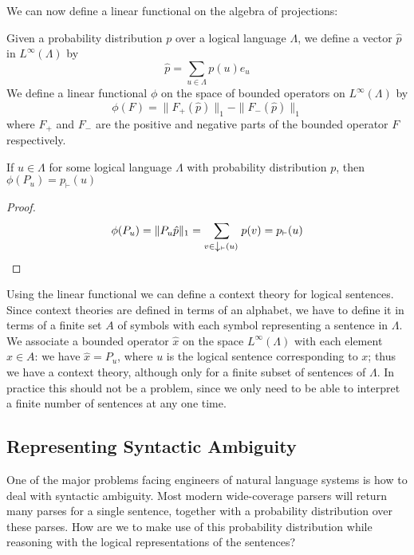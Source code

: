 We can now define a linear functional on the algebra of projections:
\begin{defn}
Given a probability distribution $p$ over a logical language $\Lambda$, we define a vector $\hat{p}$ in $L^\infty(\Lambda)$ by
$$\hat{p} = \sum_{u \in \Lambda} p(u)e_u$$
We define a linear functional $\phi$ on  the space of bounded operators on $L^\infty(\Lambda)$  by
$$\phi(F) = \|F_+(\hat{p})\|_1 - \|F_-(\hat{p})\|_1$$
where $F_+$ and $F_-$ are the positive and negative parts of the bounded operator $F$ respectively.
\end{defn}
\begin{prop} If $u \in \Lambda$ for some logical language $\Lambda$ with probability distribution $p$, then
$\phi(P_u) = p_\vdash(u)$
\end{prop}
\begin{proof}
$$\phi(P_u) = \|P_u\hat{p}\|_1 = \sum_{v \in \left\downarrow_\vdash(u)\right.}p(v) = p_\vdash(u)$$
\end{proof}

Using the linear functional we can define a context theory for logical sentences. Since context theories are defined in terms of an alphabet, we have to define it in terms of a finite set $A$ of symbols with each symbol representing a sentence in $\Lambda$. We associate a bounded operator $\hat{x}$ on the space $L^\infty(\Lambda)$ with each element $x\in A$: we have $\hat{x} = P_u$, where $u$ is the logical sentence corresponding to $x$; thus we have a context theory, although only for a finite subset of sentences of $\Lambda$. In practice this should not be a problem, since we only need to be able to interpret a finite number of sentences at any one time.


\subsection{Representing Syntactic Ambiguity}

One of the major problems facing engineers of natural language systems is how to deal with syntactic ambiguity. Most modern wide-coverage parsers will return many parses for a single sentence, together with a probability distribution over these parses. How are we to make use of this probability distribution while reasoning with the logical representations of the sentences?

